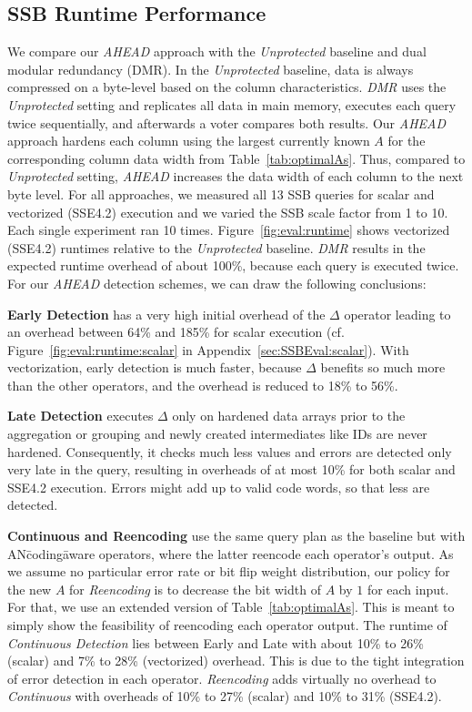 \subsection{SSB Runtime Performance}
We compare our \emph{AHEAD} approach with the \emph{Unprotected} baseline and dual modular redundancy (DMR). In the \emph{Unprotected} baseline, data is always compressed on a byte-level based on the column characteristics. \emph{DMR} uses the \emph{Unprotected} setting and replicates all data in main memory, executes each query twice sequentially, and afterwards a voter compares both results. Our \emph{AHEAD} approach hardens each column using the largest currently known \(A\) for the corresponding column data width from Table~\ref{tab:optimalAs}. Thus, compared to \emph{Unprotected} setting, \emph{AHEAD} increases the data width of each column to the next byte level. For all approaches, we measured all 13 SSB queries for scalar and vectorized (SSE4.2) execution and we varied the SSB scale factor from 1 to 10. Each single experiment ran 10 times. Figure~\ref{fig:eval:runtime} shows vectorized (SSE4.2) runtimes relative to the \emph{Unprotected} baseline. \emph{DMR} results in the expected runtime overhead of about 100\%, because each query is executed twice. For our \emph{AHEAD} detection schemes, we can draw the following conclusions:

\textbf{Early Detection} has a very high initial overhead of the \(\Delta\) operator leading to an overhead between 64\% and 185\% for scalar execution (cf. Figure~\ref{fig:eval:runtime:scalar} in Appendix~\ref{sec:SSBEval:scalar}). With vectorization, early detection is much faster, because \(\Delta\) benefits so much more than the other operators, and the overhead is reduced to 18\% to 56\%.

\textbf{Late Detection} executes \(\Delta\) only on hardened data arrays prior to the aggregation or grouping and newly created intermediates like IDs are never hardened. Consequently, it checks much less values and errors are detected only very late in the query, resulting in overheads of at most 10\% for both scalar and SSE4.2 execution. Errors might add up to valid code words, so that less are detected.

\textbf{Continuous and Reencoding} use the same query plan as the baseline but with AN\=coding\=aware operators, where the latter reencode each operator's output. As we assume no particular error rate or bit flip weight distribution, our policy for the new \(A\) for \emph{Reencoding} is to decrease the bit width of \(A\) by $1$ for each input. For that, we use an extended version of Table~\ref{tab:optimalAs}. This is meant to simply show the feasibility of reencoding each operator output. The runtime of \emph{Continuous Detection} lies between Early and Late with about 10\% to 26\% (scalar) and 7\% to 28\% (vectorized) overhead. This is due to the tight integration of error detection in each operator. \emph{Reencoding} adds virtually no overhead to \emph{Continuous} with overheads of 10\% to 27\% (scalar) and 10\% to 31\% (SSE4.2).

